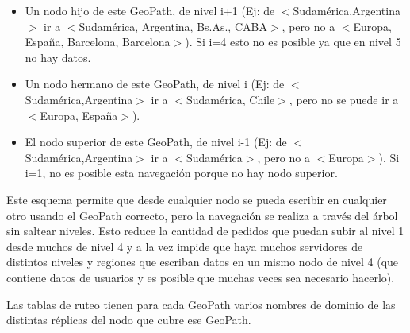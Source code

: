 \begin{itemize}
	\item Un nodo hijo de este GeoPath, de nivel i+1 (Ej: de $<$Sudamérica,Argentina$>$ ir a $<$Sudamérica, Argentina, Bs.As., CABA$>$, pero no a $<$Europa, España, Barcelona, Barcelona$>$). Si i=4 esto no es posible ya que en nivel 5 no hay datos.
	\item Un nodo hermano de este GeoPath, de nivel i (Ej: de $<$Sudamérica,Argentina$>$ ir a $<$Sudamérica, Chile$>$, pero no se puede ir a $<$Europa, España$>$).
	\item El nodo superior de este GeoPath, de nivel i-1 (Ej: de $<$Sudamérica,Argentina$>$ ir a $<$Sudamérica$>$, pero no a $<$Europa$>$). Si i=1, no es posible esta navegación porque no hay nodo superior.
\end{itemize}

Este esquema permite que desde cualquier nodo se pueda escribir en cualquier otro usando el GeoPath correcto, pero la navegación se realiza a través del árbol sin saltear niveles. Esto reduce la cantidad de pedidos que puedan subir al nivel 1 desde muchos de nivel 4 y a la vez impide que haya muchos servidores de distintos niveles y regiones que escriban datos en un mismo nodo de nivel 4 (que contiene datos de usuarios y es posible que muchas veces sea necesario hacerlo).

Las tablas de ruteo tienen para cada GeoPath varios nombres de dominio de las distintas réplicas del nodo que cubre ese GeoPath.

